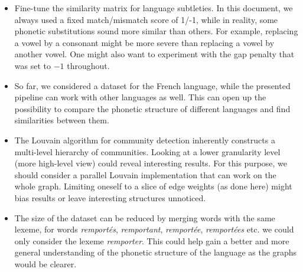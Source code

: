 \begin{itemize}
    \item Fine-tune the similarity matrix for language subtleties. In this document, we always used a fixed match/mismatch score of 1/-1, while in reality, some phonetic substitutions sound more similar than others. For example, replacing a vowel by a consonant might be more severe than replacing a vowel by another vowel. One might also want to experiment with the gap penalty that was set to $-1$ throughout.
    
    \item So far, we considered a dataset for the French language, while the presented pipeline can work with other languages as well. This can open up the possibility to compare the phonetic structure of different languages and find similarities between them.
    
    \item The Louvain algorithm for community detection inherently constructs a multi-level hierarchy of communities. Looking at a lower granularity level (more high-level view) could reveal interesting results. For this purpose, we should consider a parallel Louvain implementation that can work on the whole graph. Limiting oneself to a slice of edge weights (as done here) might bias results or leave interesting structures unnoticed.
    
    \item The size of the dataset can be reduced by merging words with the same lexeme, \eg for words \textit{remportés}, \textit{remportant}, \textit{remportée}, \textit{remportées} etc. we could only consider the lexeme \textit{remporter}. This could help gain a better and more general understanding of the phonetic structure of the language as the graphs would be clearer.
\end{itemize}
